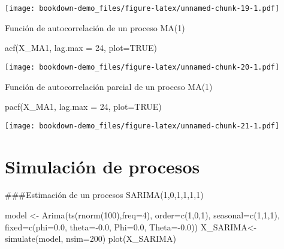 \documentclass[
]{book}
\newenvironment{Shaded}{\begin{snugshade}}{\end{snugshade}}
\newcommand{\AttributeTok}[1]{\textcolor[rgb]{0.77,0.63,0.00}{#1}}
\newcommand{\ConstantTok}[1]{\textcolor[rgb]{0.00,0.00,0.00}{#1}}
\newcommand{\DecValTok}[1]{\textcolor[rgb]{0.00,0.00,0.81}{#1}}
\newcommand{\FloatTok}[1]{\textcolor[rgb]{0.00,0.00,0.81}{#1}}
\newcommand{\FunctionTok}[1]{\textcolor[rgb]{0.00,0.00,0.00}{#1}}
\newcommand{\NormalTok}[1]{#1}
\newcommand{\OtherTok}[1]{\textcolor[rgb]{0.56,0.35,0.01}{#1}}
\newcommand{\SpecialCharTok}[1]{\textcolor[rgb]{0.00,0.00,0.00}{#1}}
\begin{document}
\texttt{[image: bookdown-demo\_files/figure-latex/unnamed-chunk-19-1.pdf]}

Función de autocorrelación de un proceso MA(1)

\begin{Shaded}
\begin{Highlighting}[]
\FunctionTok{acf}\NormalTok{(X\_MA1, }\AttributeTok{lag.max =} \DecValTok{24}\NormalTok{, }\AttributeTok{plot=}\ConstantTok{TRUE}\NormalTok{)}
\end{Highlighting}
\end{Shaded}

\texttt{[image: bookdown-demo\_files/figure-latex/unnamed-chunk-20-1.pdf]}

Función de autocorrelación parcial de un proceso MA(1)

\begin{Shaded}
\begin{Highlighting}[]
\FunctionTok{pacf}\NormalTok{(X\_MA1, }\AttributeTok{lag.max =} \DecValTok{24}\NormalTok{, }\AttributeTok{plot=}\ConstantTok{TRUE}\NormalTok{)}
\end{Highlighting}
\end{Shaded}

\texttt{[image: bookdown-demo\_files/figure-latex/unnamed-chunk-21-1.pdf]}

\hypertarget{simulaciuxf3n-de-procesos}{%
\section{Simulación de procesos}\label{simulaciuxf3n-de-procesos}}

\#\#\#Estimación de un procesos SARIMA(1,0,1,1,1,1)

\begin{Shaded}
\begin{Highlighting}[]
\NormalTok{model    }\OtherTok{\textless{}{-}} \FunctionTok{Arima}\NormalTok{(}\FunctionTok{ts}\NormalTok{(}\FunctionTok{rnorm}\NormalTok{(}\DecValTok{100}\NormalTok{),}\AttributeTok{freq=}\DecValTok{4}\NormalTok{), }\AttributeTok{order=}\FunctionTok{c}\NormalTok{(}\DecValTok{1}\NormalTok{,}\DecValTok{0}\NormalTok{,}\DecValTok{1}\NormalTok{), }\AttributeTok{seasonal=}\FunctionTok{c}\NormalTok{(}\DecValTok{1}\NormalTok{,}\DecValTok{1}\NormalTok{,}\DecValTok{1}\NormalTok{),}
            \AttributeTok{fixed=}\FunctionTok{c}\NormalTok{(}\AttributeTok{phi=}\FloatTok{0.0}\NormalTok{, }\AttributeTok{theta=}\SpecialCharTok{{-}}\FloatTok{0.0}\NormalTok{, }\AttributeTok{Phi=}\FloatTok{0.0}\NormalTok{, }\AttributeTok{Theta=}\SpecialCharTok{{-}}\FloatTok{0.0}\NormalTok{))}
\NormalTok{X\_SARIMA}\OtherTok{\textless{}{-}} \FunctionTok{simulate}\NormalTok{(model, }\AttributeTok{nsim=}\DecValTok{200}\NormalTok{)}
\FunctionTok{plot}\NormalTok{(X\_SARIMA)}
\end{Highlighting}
\end{Shaded}
\end{document}
